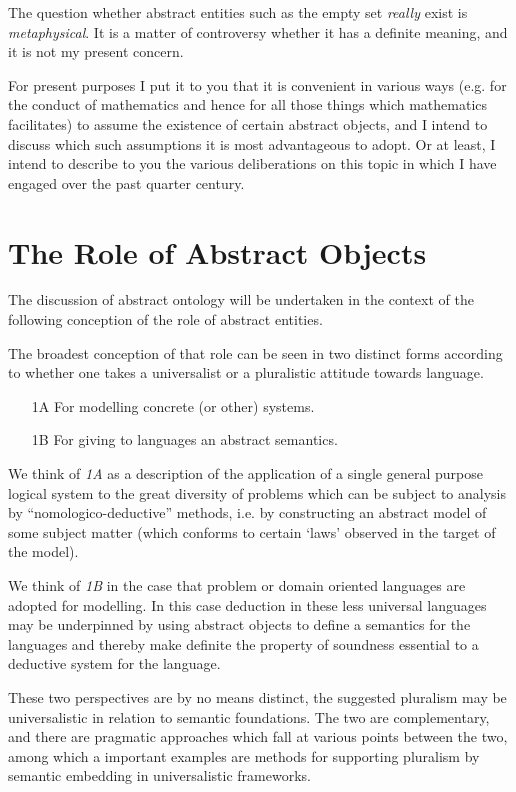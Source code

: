 \documentclass[numreferences]{rbjk}
\begin{document}
\begin{article}
The question whether abstract entities such as the empty set {\it really} exist is {\it metaphysical}.
It is a matter of controversy whether it has a definite meaning, and it is not my present concern.

For present purposes I put it to you that it is convenient in various ways (e.g. for the conduct of mathematics and hence for all those things which mathematics facilitates) to assume the existence of certain abstract objects, and I intend to discuss which such assumptions it is most advantageous to adopt.
Or at least, I intend to describe to you the various deliberations on this topic in which I have engaged over the past quarter century.

\section{The Role of Abstract Objects}

The discussion of abstract ontology will be undertaken in the context of the following conception of the role of abstract entities.

The broadest conception of that role can be seen in two distinct forms according to whether one takes a universalist or a pluralistic attitude towards language.

\begin{itemize}
\item[1A] For modelling concrete (or other) systems.
\item[1B] For giving to languages an abstract semantics.
\end{itemize}

We think of \emph{1A} as a description of the application of a single general purpose logical system to the great diversity of problems which can be subject to analysis by ``nomologico-deductive'' methods, i.e. by constructing an abstract model of some subject matter (which conforms to certain `laws' observed in the target of the model).

We think of \emph{1B} in the case that problem or domain oriented languages are adopted for modelling.
In this case deduction in these less universal languages may be underpinned by using abstract objects to define a semantics for the languages and thereby make definite the property of soundness essential to a deductive system for the language.

These two perspectives are by no means distinct, the suggested pluralism may be universalistic in relation to semantic foundations.
The two are complementary, and there are pragmatic approaches which fall at various points between the two, among which a important examples are methods for supporting pluralism by semantic embedding in universalistic frameworks.


\end{article}
\end{document}
